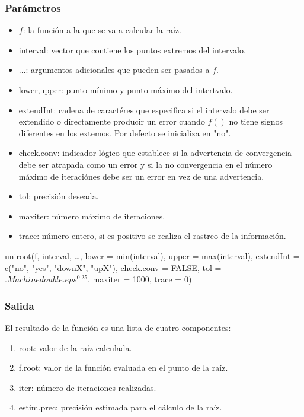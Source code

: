 \documentclass[a4paper,12pt]{article}
\begin{document}
\subsubsection{Parámetros}
 \begin{itemize}
    \item $f$: la función a la que se va a calcular la raíz.
    \item interval: vector que contiene los puntos extremos del intervalo.
    \item ...: argumentos adicionales que pueden ser pasados a $f$.
    \item lower,upper: punto mínimo y punto máximo del intertvalo.
    \item extendInt: cadena de caractéres que especifica si el intervalo debe ser extendido o directamente producir un error cuando $f()$ no tiene signos diferentes en los extemos. Por defecto se inicializa en "no".
    \item check.conv: indicador lógico que establece si la advertencia de convergencia debe ser atrapada como un error y si la no convergencia en el número máximo de iteraciónes debe ser un error en vez de una advertencia.
    \item tol: precisión deseada.
    \item maxiter: número máximo de iteraciones.
    \item trace: número entero, si es positivo se realiza el rastreo de la información.
\end{itemize}

 uniroot(f, interval, …,
        lower = min(interval), upper = max(interval),
        extendInt = c("no", "yes", "downX", "upX"), check.conv = FALSE,
        tol = $.Machinedouble.eps^0.25$, maxiter = 1000, trace = 0)

\subsubsection{Salida}
El resultado de la función es una lista de cuatro componentes:
\begin{enumerate}
    \item root: valor de la raíz calculada.
    \item f.root: valor de la función evaluada en el punto de la raíz.
    \item iter: número de iteraciones realizadas.
    \item estim.prec: precisión estimada para el cálculo de la raíz.
\end{enumerate}
\end{document}
